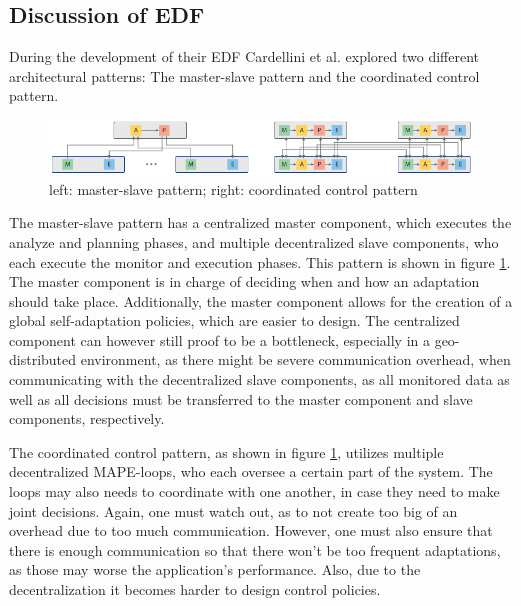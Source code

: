         \subsection{Discussion of EDF}
        \label{sub:discussion-edf}
        During the development of their EDF Cardellini et al. explored two different architectural patterns: The master-slave pattern and the coordinated control pattern.

        \begin{figure}[hbt]
            \centering
            \includegraphics[width=1.0\textwidth]{Bilder/master_coordinated.png}
            \caption{
                    left: master-slave pattern; right: coordinated control pattern\cite{cardellini}
            }
            \label{fig:master_coordinated}
        \end{figure}

        \quad The master-slave pattern has a centralized master component, which executes the analyze and planning phases, and multiple decentralized slave components, 
        who each execute the monitor and execution phases. This pattern is shown in figure \ref{fig:master_coordinated}.
        The master component is in charge of deciding when and how an adaptation should take place.
        Additionally, the master component allows for the creation of a global self-adaptation policies, which are easier to design.
        The centralized component can however still proof to be a bottleneck, especially in a geo-distributed environment, as there might be severe communication overhead, when communicating 
        with the decentralized slave components, as all monitored data as well as all decisions must be transferred to the master component and slave components, respectively. 

        \quad The coordinated control pattern, as shown in figure \ref{fig:master_coordinated}, utilizes multiple decentralized MAPE-loops, who each oversee a certain part of the system. 
        The loops may also needs to coordinate with one another, in case they need to make joint decisions. Again, one must watch out, as to not create too big of an overhead due to too much communication.
        However, one must also ensure that there is enough communication so that there won't be too frequent adaptations, as those may worse the application's performance.
        Also, due to the decentralization it becomes harder to design control policies.
        
